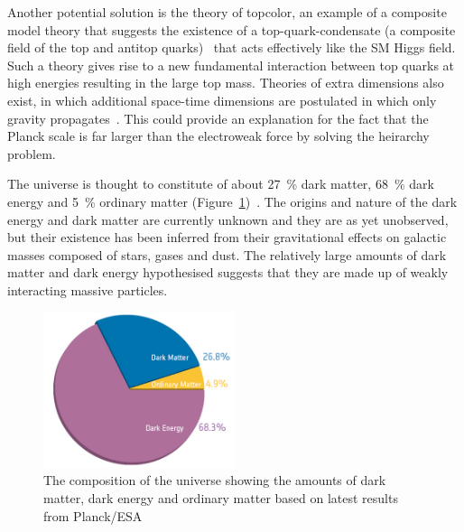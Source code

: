 Another potential solution is the theory of topcolor, an example of a composite model theory that suggests the
existence of a top-quark-condensate (a composite field of the top and antitop
quarks)~\cite{1990PhRvD..41.1647B,1991PhLB..266..419H} that acts effectively like the SM Higgs field. Such a
theory gives rise to a new fundamental interaction between top quarks at high energies resulting in the large
top mass. Theories of extra dimensions also exist, in which additional space-time dimensions are postulated in
which only gravity propagates~\cite{ArkaniHamed:1998rs}. This could provide an explanation for the fact that
the Planck scale is far larger than the electroweak force by solving the heirarchy problem.

The universe is thought to constitute of about 27~\% dark matter, 68~\% dark energy and 5~\% ordinary
matter (Figure~\ref{fig:universe_composition})~\cite{Ade:2013sjv}. The origins and nature of the dark energy and dark
matter are currently unknown and they are as yet unobserved, but their existence has been inferred from their
gravitational effects on galactic masses composed of stars, gases and dust. The relatively large amounts of
dark matter and dark energy hypothesised suggests that they are made up of weakly interacting massive
particles.

\begin{figure}[hbtp]
   \centering
     \includegraphics[width=0.5\textwidth]{Chapters/03_Theory/Images/planck_cosmic_pie}\hfill
     \caption[The composition of the universe showing the amounts of dark matter, dark energy and ordinary
     matter.]{The composition of the universe showing the amounts of dark matter, dark energy and ordinary
     matter based on latest results from Planck/ESA~\cite{Ade:2013sjv}}
     \label{fig:universe_composition}
\end{figure}
